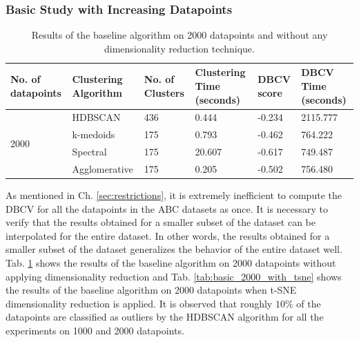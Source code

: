 \subsubsection{Basic Study with Increasing Datapoints}
\begin{table}[H]
  \setlength\extrarowheight{10pt}
  \caption{Results of the baseline algorithm on 2000 datapoints and without any dimensionality reduction technique. }
  \centering
  \begin{tabular}{|p{50pt}|p{60pt}|p{50pt}|p{40pt}|p{50pt}|p{40pt}|}
    \toprule
    No. of datapoints & Clustering Algorithm & No. of Clusters & Clustering Time (seconds) & \ac{DBCV} score & \ac{DBCV} Time (seconds)\\
    \midrule
    \multirow{4}{1.0in}{2000} & \ac{HDBSCAN}	& 436	& 0.444 & -0.234	& 2115.777 \\ \cline{2-6} 
                              & k-medoids	& 175	& 0.793 & -0.462	& 764.222 \\ \cline{2-6} 
                              & Spectral	& 175	& 20.607 & -0.617	& 749.487 \\ \cline{2-6}
                              & Agglomerative	& 175	& 0.205 & -0.502	& 756.480 \\ 
    \bottomrule
  \end{tabular}
  \label{tab:basic_2000_without_tsne}
\end{table}
As mentioned in Ch. \ref{sec:restrictions}, it is extremely inefficient to compute the \ac{DBCV} for all the datapoints in the ABC datasets \cite{Koch_2019_CVPR} as once. It is necessary to verify that the results obtained for a smaller subset of the dataset can be interpolated for the entire dataset. In other words, the results obtained for a smaller subset of the dataset generalizes the behavior of the entire dataset well. Tab. \ref{tab:basic_2000_without_tsne} shows the results of the baseline algorithm on 2000 datapoints without applying dimensionality reduction and Tab. \ref{tab:basic_2000_with_tsne} shows the results of the baseline algorithm on 2000 datapoints when \ac{t-SNE} dimensionality reduction is applied. It is observed that roughly $10\%$ of the datapoints are classified as outliers by the \ac{HDBSCAN} algorithm for all the experiments on 1000 and 2000 datapoints. 

